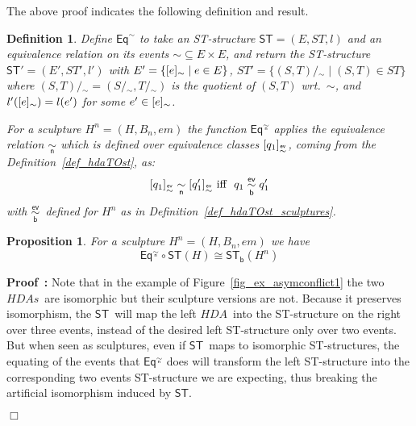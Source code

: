 \documentclass[submission,copyright,creativecommons]{eptcs}
\newtheorem{proposition}[theorem]{Proposition}
\newtheorem{definition}[theorem]{Definition}
\newenvironment{proof}[1][\!\!\,]{\vspace{1ex}\noindent\textbf{Proof #1: }}{\hfill$\Box$\vspace{2ex}}
\newcommand{\cp}[1]{}
\newcommand\HDA{\ensuremath{\mathit{HDA}}}
\newcommand\HDAs{\ensuremath{\mathit{HDAs}}}
\newcommand\ST{\ensuremath{\mathsf{ST}}}
\newcommand\isomorphic{\ensuremath{\cong}}
\newcommand\hintost{\ensuremath{\mathsf{ST}}}
\newcommand\equiatingEvents[1]{\ensuremath{\mathsf{Eq}^{#1}}}
\newcommand\hintostScultures{\ensuremath{\mathsf{ST}_{\!\mathsf{b}}}}
\newcommand\quotientofwrt[2]{\ensuremath{#1\!/\!_{#2}}}
\newcommand\sculpture[2]{\ensuremath{#1^{#2}}}
\newcommand\embedMorphism{\ensuremath{\mathit{em}}}
\newcommand\eventEquivHDAs{\ensuremath{\stackrel{\mathsf{ev}}{\sim}}}
\newcommand\eventEquivHDAsculpture{\ensuremath{\overset{\mathsf{ev}}{\underset{\mathsf{b}}{\sim}}}}
\newcommand\eventEquivFromBulk[1]{\ensuremath{\underset{\mathsf{#1}}{\sim}}}
\newcommand{\equivClass}[2][]{\ensuremath{[#2]\ifthenelse{\equal{#1}{}}{}{_{#1}}}}
\begin{document}
The above proof indicates the following definition and result.

\begin{definition}
Define $\equiatingEvents{\sim}$ to take an ST-structure $\ST=(E,ST,l)$ and an equivalence relation on its events $\sim\subseteq E\times E$, and return the ST-structure $\ST'=(E',ST',l')$ with $E'=\{\equivClass[\sim]{e}\mid e\in E\}$, $ST'=\{\quotientofwrt{(S,T)}{\sim} \mid (S,T)\in ST\}$ where $\quotientofwrt{(S,T)}{\sim}=(\quotientofwrt{S}{\sim},\quotientofwrt{T}{\sim})$ is the quotient of $(S,T)$ wrt.\ $\sim$, and $l'(\equivClass[\sim]{e})=l(e')$ for some $e'\in\equivClass[\sim]{e}$.

For a sculpture $\sculpture{H}{n}=(H,B_{n},\embedMorphism)$ the function $\equiatingEvents{\eventEquivFromBulk{n}}$ applies the equivalence relation \eventEquivFromBulk{n} which is defined over equivalence classes $\equivClass[\eventEquivHDAs]{q_{1}}$, coming from the Definition~\ref{def_hdaTOst}, as: 
\[
\equivClass[\eventEquivHDAs]{q_{1}} \eventEquivFromBulk{n} \equivClass[\eventEquivHDAs]{q'_{1}} \mbox{\ iff \ }
q_{1} \eventEquivHDAsculpture  q'_{1}
\]
with \eventEquivHDAsculpture\ defined for \sculpture{H}{n} as in Definition~\ref{def_hdaTOst_sculptures}.
\end{definition}



\begin{proposition}\label{prop_eqcircst}
For a sculpture $\sculpture{H}{n}=(H,B_{n},\embedMorphism)$ we have
\[
\equiatingEvents{\eventEquivFromBulk{n}}\circ\hintost(H)\isomorphic \hintostScultures(\sculpture{H}{n})
\]
\end{proposition}

\begin{proof}
Note that in the example of Figure~\ref{fig_ex_asymconflict1} the two \HDAs\ are isomorphic but their sculpture versions are not. Because it preserves isomorphism, the \hintost\ will map the left \HDA\ into the ST-structure on the right over three events, instead of the desired left ST-structure only over two events. But when seen as sculptures, even if \hintost\ maps to isomorphic ST-structures, the equating of the events that $\equiatingEvents{\eventEquivFromBulk{n}}$ does will transform the left ST-structure into the corresponding two events ST-structure we are expecting, thus breaking the artificial isomorphism induced by \hintost.

\cp{Finish proof!!}
\end{proof}
\end{document}
